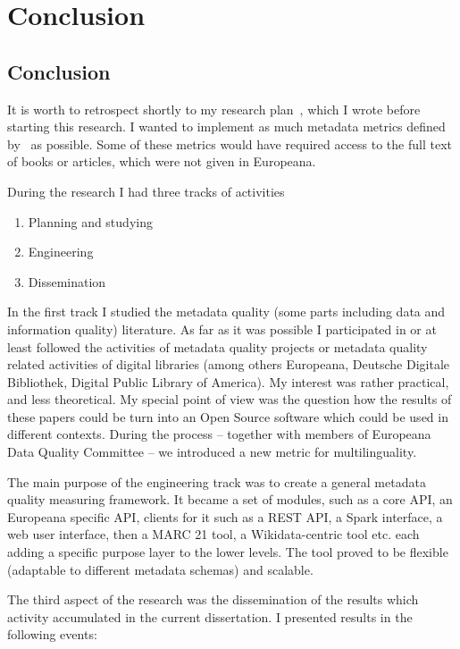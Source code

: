 \chapter{Conclusion}

\section{Conclusion}

It is worth to retrospect shortly to my research plan~\cite{kiraly2015a}, which I wrote before starting this research. I wanted to implement as much metadata metrics defined by~\cite{bruce-hillmann2004, ochoa-duval2009} as possible. Some of these metrics would have required access to the full text of books or articles, which were not given in Europeana.

During the research I had three tracks of activities

\begin{enumerate}
\item Planning and studying
\item Engineering
\item Dissemination
\end{enumerate}

In the first track I studied the metadata quality (some parts including data and information quality) literature. As far as it was possible I participated in or at least followed the activities of metadata quality projects or metadata quality related activities of digital libraries (among others Europeana, Deutsche Digitale Bibliothek, Digital Public Library of America). My interest was rather practical, and less theoretical. My special point of view was the question how the results of these papers could be turn into an Open Source software which could be used in different contexts. During the process -- together with members of Europeana Data Quality Committee -- we introduced a new metric for multilinguality.

The main purpose of the engineering track was to create a general metadata quality measuring framework. It became a set of modules, such as a core API, an Europeana specific API, clients for it such as a REST API, a Spark interface, a web user interface, then a MARC 21 tool, a Wikidata-centric tool etc. each adding a specific purpose layer to the lower levels. The tool proved to be flexible (adaptable to different metadata schemas) and scalable.

The third aspect of the research was the dissemination of the results which activity accumulated in the current dissertation. I presented results in the following events:

